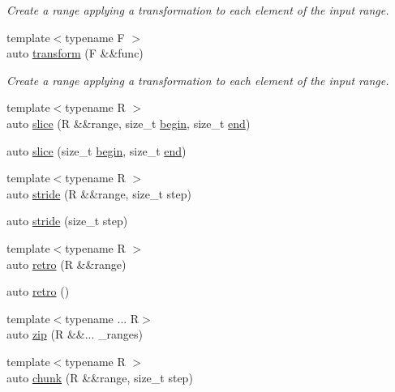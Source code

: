 \begin{DoxyCompactItemize}
\begin{DoxyCompactList}\small\item\em Create a range applying a transformation to each element of the input range. \end{DoxyCompactList}\item 
{\footnotesize template$<$typename F $>$ }\\auto \mbox{\hyperlink{namespacerah_1_1view_a814771afc1cfedc6418915550bcd5bbd}{transform}} (F \&\&func)
\begin{DoxyCompactList}\small\item\em Create a range applying a transformation to each element of the input range. \end{DoxyCompactList}\item 
{\footnotesize template$<$typename R $>$ }\\auto \mbox{\hyperlink{namespacerah_1_1view_ae4788f8f81a2830f39cf049cfa0faa87}{slice}} (R \&\&range, size\+\_\+t \mbox{\hyperlink{namespacerah_a2c4a19e57cc4e0753e93830f247def6d}{begin}}, size\+\_\+t \mbox{\hyperlink{namespacerah_aaddd1442cd76b96876e692cdefe7261d}{end}})
\item 
auto \mbox{\hyperlink{namespacerah_1_1view_a5de38bdaa214caef589b2adcdc59dd0b}{slice}} (size\+\_\+t \mbox{\hyperlink{namespacerah_a2c4a19e57cc4e0753e93830f247def6d}{begin}}, size\+\_\+t \mbox{\hyperlink{namespacerah_aaddd1442cd76b96876e692cdefe7261d}{end}})
\item 
{\footnotesize template$<$typename R $>$ }\\auto \mbox{\hyperlink{namespacerah_1_1view_a112a1a8d31435c1070c4cd98cc02d96a}{stride}} (R \&\&range, size\+\_\+t step)
\item 
auto \mbox{\hyperlink{namespacerah_1_1view_a6b2ab3621be4004c35d77f06165fce78}{stride}} (size\+\_\+t step)
\item 
{\footnotesize template$<$typename R $>$ }\\auto \mbox{\hyperlink{namespacerah_1_1view_ab7e756d22f9204231b4854b9deb51f6f}{retro}} (R \&\&range)
\item 
auto \mbox{\hyperlink{namespacerah_1_1view_a6c6543c61f1fb119394952a72c564753}{retro}} ()
\item 
{\footnotesize template$<$typename ... R$>$ }\\auto \mbox{\hyperlink{namespacerah_1_1view_a26c5da9052b94179d6ad8614ea2b9fda}{zip}} (R \&\&... \+\_\+ranges)
\item 
{\footnotesize template$<$typename R $>$ }\\auto \mbox{\hyperlink{namespacerah_1_1view_aa4ea72dd93cb1d17db2f4755bdee0cef}{chunk}} (R \&\&range, size\+\_\+t step)

\end{DoxyCompactItemize}
